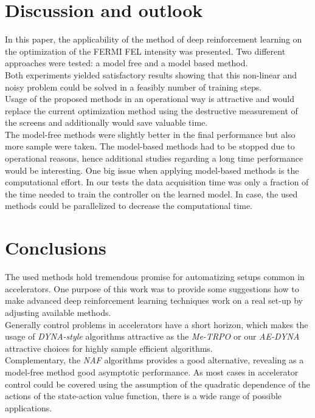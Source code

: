 \documentclass[
reprint,
amsmath,amssymb,amsfonts,clevref,
aps,
prstab,
]{revtex4-2}
\begin{document}
	\section{Discussion and outlook}
	In this paper, the applicability of the method of deep reinforcement learning on the optimization of the FERMI FEL intensity was presented. Two different approaches were tested: a model free and a model based method.\\
	 Both experiments yielded satisfactory results showing that this non-linear and noisy problem could be solved in a feasibly number of training steps.\\
	Usage of the proposed methods in an operational way is attractive and would replace the current optimization method using the destructive measurement of the screens and additionally would save valuable time.\\ 
	The model-free methods were slightly better in the final performance but also more sample were taken. The model-based methods had to be stopped due to operational reasons, hence additional studies regarding a long time performance would be interesting. One big issue when applying model-based methods is the computational effort. In our tests the data acquisition time was only a fraction of the time needed to train the controller on the learned model. In case, the used methods could be parallelized to decrease the computational time.
	
\section{Conclusions}
 The used methods hold tremendous promise for automatizing setups common in accelerators. One purpose of this work was to provide some suggestions how to make advanced deep reinforcement learning techniques work on a real set-up by adjusting available methods.\\
 Generally control problems in accelerators have a short horizon, which makes the usage of \emph{DYNA-style} algorithms attractive as the \emph{Me-TRPO} or our  \emph{AE-DYNA} attractive choices for highly sample efficient algorithms.\\
 Complementary, the \emph{NAF} algorithms provides a good alternative, revealing as a model-free method good asymptotic performance. As most cases in accelerator control could be covered using the assumption of the quadratic dependence of the actions of the state-action value function, there is a wide range of possible applications.\\
 
\end{document}
